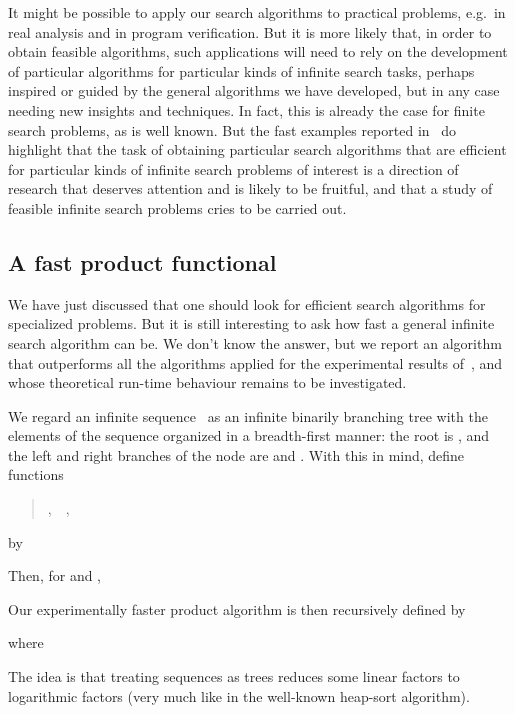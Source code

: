 \documentclass{LMCS}
\begin{document}
It might be possible to apply our search algorithms to practical
problems, e.g.\ in real analysis and in program verification.  But it
is more likely that, in order to obtain feasible algorithms, such
applications will need to rely on the development of particular
algorithms for particular kinds of infinite search tasks, perhaps
inspired or guided by the general algorithms we have developed, but in
any case needing new insights and techniques.  In fact, this is
already the case for finite search problems, as is well known.  But
the fast examples reported in~\cite{escardo:lics07} do highlight that
the task of obtaining particular search algorithms that are efficient
for particular kinds of infinite search problems of interest is a
direction of research that deserves attention and is likely to be
fruitful, and that a study of feasible infinite search problems cries
to be carried out.

\subsection{A fast product functional}

We have just discussed that one should look for efficient search
algorithms for specialized problems.  But it is still interesting to
ask how fast a general infinite search algorithm can be.  We don't
know the answer, but we report an algorithm that outperforms all the
algorithms applied for the experimental results
of~\cite{escardo:lics07}, and whose theoretical run-time behaviour
remains to be investigated.

\newcommand{\Root}{\operatorname{root}}
\newcommand{\Left}{\operatorname{left}}
\newcommand{\Right}{\operatorname{right}}
\newcommand{\branch}{\operatorname{branch}} 

We regard an infinite sequence~ as an infinite binarily
branching tree with the elements of the sequence organized in a
breadth-first manner: the root is , and the left and right
branches of the node  are  and .  With this
in mind, define functions
\begin{quote}
  , \,\, , \,\, 
\end{quote}
by


Then, for  and ,


Our experimentally faster product algorithm is then recursively defined by

where



The idea is that treating sequences as trees reduces some linear
factors to logarithmic factors (very much like in the well-known
heap-sort algorithm).
\end{document}
